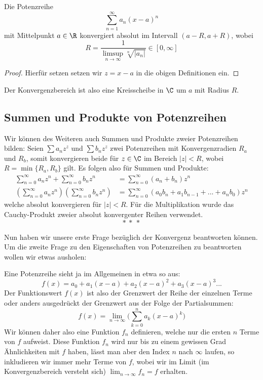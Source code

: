 \begin{lemma}{}{}
Die Potenzreihe
$$\sum_{n = 1}^\infty a_n (x-a)^n$$
mit Mittelpunkt $a \in \R$ konvergiert absolut im Intervall $(a-R, a+R)$, wobei 
$$R = \frac{1}{\limsup_{n \to \infty}\sqrt[n]{|a_n|}} \in [0, \infty]$$
\end{lemma}

\begin{proof}
Hierfür setzen setzen wir $z = x - a$ in die obigen Definitionen ein.
\end{proof}

Der Konvergenzbereich ist also eine Kreisscheibe in $\C$ um $a$ mit Radius $R$. 

\subsection{Summen und Produkte von Potenzreihen}
Wir können des Weiteren auch Summen und Produkte zweier Potenzreihen bilden: Seien $\sum a_n z^z$ und $\sum b_n z^z$ zwei Potenzreihen mit Konvergenzradien $R_a$ und $R_b$, somit konvergieren beide für $z \in \C$ im Bereich $|z| < R$, wobei $R = \min\{R_a, R_b\}$ gilt. Es folgen also für Summen und Produkte:
\begin{align*}
    \sum_{n = 0}^\infty a_n z^n + \sum_{n = 0}^\infty b_n z^n &= \sum_{n = 0}^\infty (a_n + b_n) z^n\\
    (\sum_{n = 0}^\infty a_n z^n)(\sum_{n = 0}^\infty b_n z^n) &= \sum_{n = 0}^\infty (a_0b_n + a_1b_{n-1} + ... + a_nb_0 )z^n
\end{align*}
welche absolut konvergieren für $|z| < R$. Für die Multiplikation wurde das Cauchy-Produkt zweier absolut konvergenter Reihen verwendet.
$$*\ *\ *$$

Nun haben wir unsere erste Frage bezüglich der Konvergenz beantworten können. Um die zweite Frage zu den Eigenschaften von Potenzreihen zu beantworten wollen wir etwas ausholen:

Eine Potenzreihe sieht ja im Allgemeinen in etwa so aus:
$$f(x) = a_0 + a_1(x-a) + a_2(x-a)^2 + a_3(x-a)^3...$$
Der Funktionswert $f(x)$ ist also der Grenzwert der Reihe der einzelnen Terme oder anders ausgedrückt der Grenzwert aus der Folge der Partialsummen:
$$f(x) = \lim_{n \to \infty}\Big( \sum_{k=0}^n a_k(x-a)^k \Big)$$
Wir können daher also eine Funktion $f_n$ definieren, welche nur die ersten $n$ Terme von $f$ aufweist. Diese Funktion $f_n$ wird nur bis zu einem gewissen Grad Ähnlichkeiten mit $f$ haben, lässt man aber den Index $n$ nach $\infty$ laufen, so inkludieren wir immer mehr Terme von $f$, wobei wir im Limit (im Konvergenzbereich versteht sich) $\lim_{n \to \infty} f_n = f$ erhalten.

